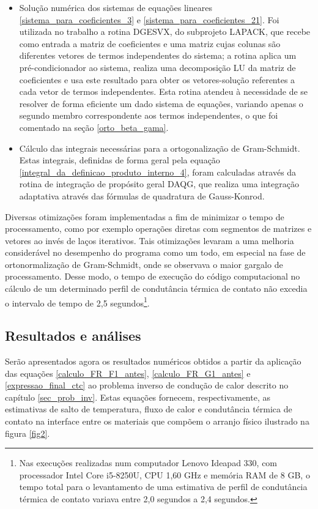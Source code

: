 \begin{itemize}
	\item Solução numérica dos sistemas de equações lineares \eqref{sistema_para_coeficientes_3} e \eqref{sistema_para_coeficientes_21}. Foi utilizada no trabalho a rotina DGESVX, do subprojeto LAPACK, que recebe como entrada a matriz de coeficientes e uma matriz cujas colunas são diferentes vetores de termos independentes do sistema; a rotina aplica um pré-condicionador ao sistema, realiza uma decomposição LU da matriz de coeficientes e usa este resultado para obter os vetores-solução referentes a cada vetor de termos independentes. Esta rotina atendeu à necessidade de se resolver de forma eficiente um dado sistema de equações, variando apenas o segundo membro correspondente aos termos independentes, o que foi comentado na seção \ref{orto_beta_gama}.
	
	\item Cálculo das integrais necessárias para a ortogonalização de Gram-Schmidt. Estas integrais, definidas de forma geral pela equação \eqref{integral_da_definicao_produto_interno_4}, foram calculadas através da rotina de integração de propósito geral DAQG, que realiza uma integração adaptativa através das fórmulas de quadratura de Gauss-Konrod.
\end{itemize}

Diversas otimizações foram implementadas a fim de minimizar o tempo de processamento, como por exemplo operações diretas com segmentos de matrizes e vetores ao invés de laços iterativos. Tais otimizações levaram a uma melhoria considerável no desempenho do programa como um todo, em especial na fase de ortonormalização de Gram-Schmidt, onde se observava o maior gargalo de processamento. Desse modo, o tempo de execução do código computacional no cálculo de um determinado perfil de condutância térmica de contato não excedia o intervalo de tempo de 2,5 segundos\footnote{Nas execuções realizadas num computador Lenovo Ideapad 330, com processador Intel Core\textsuperscript{\texttrademark} i5-8250U, CPU 1,60 GHz e memória RAM de 8 GB, o tempo total para o levantamento de uma estimativa de perfil de condutância térmica de contato variava entre 2,0 segundos a 2,4 segundos.}.

\subsection{Resultados e análises}

Serão apresentados agora os resultados numéricos obtidos a partir da aplicação das equações \eqref{calculo_FR_F1_antes}, \eqref{calculo_FR_G1_antes} e \eqref{expressao_final_ctc} ao problema inverso de condução de calor descrito no capítulo \ref{sec_prob_inv}. Estas equações fornecem, respectivamente, as estimativas de salto de temperatura, fluxo de calor e condutância térmica de contato na interface entre os materiais que compõem o arranjo físico ilustrado na figura \ref{fig2}.


